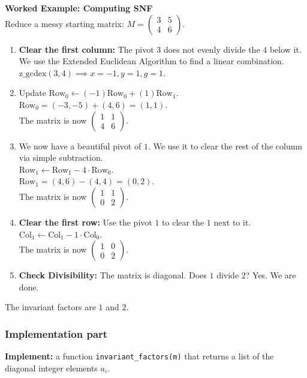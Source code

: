 \documentclass[11pt]{article}
\begin{document}
\vspace{0.5cm}
\noindent\textbf{Worked Example: Computing SNF} \\
Reduce a messy starting matrix: $M = \begin{pmatrix} 3 & 5 \\ 4 & 6 \end{pmatrix}$.
\begin{enumerate}
    \item \textbf{Clear the first column:} The pivot $3$ does not evenly divide the $4$ below it. We use the Extended Euclidean Algorithm to find a linear combination. \\
    $\text{z\_gcdex}(3, 4) \implies x = -1, y = 1, g = 1$.
    \item Update $\text{Row}_0 \leftarrow (-1)\text{Row}_0 + (1)\text{Row}_1$. \\
    $\text{Row}_0 = (-3, -5) + (4, 6) = (1, 1)$. \\
    The matrix is now $\begin{pmatrix} 1 & 1 \\ 4 & 6 \end{pmatrix}$.
    \item We now have a beautiful pivot of $1$. We use it to clear the rest of the column via simple subtraction. \\
    $\text{Row}_1 \leftarrow \text{Row}_1 - 4 \cdot \text{Row}_0$. \\
    $\text{Row}_1 = (4, 6) - (4, 4) = (0, 2)$. \\
    The matrix is now $\begin{pmatrix} 1 & 1 \\ 0 & 2 \end{pmatrix}$.
    \item \textbf{Clear the first row:} Use the pivot $1$ to clear the $1$ next to it. \\
    $\text{Col}_1 \leftarrow \text{Col}_1 - 1 \cdot \text{Col}_0$. \\
    The matrix is now $\begin{pmatrix} 1 & 0 \\ 0 & 2 \end{pmatrix}$.
    \item \textbf{Check Divisibility:} The matrix is diagonal. Does $1$ divide $2$? Yes. We are done.
\end{enumerate}
The invariant factors are $1$ and $2$.

\subsubsection*{Implementation part}
\textbf{Implement:} a function \lstinline|invariant_factors(m)| that returns a list of the diagonal integer elements $a_i$.
\end{document}
